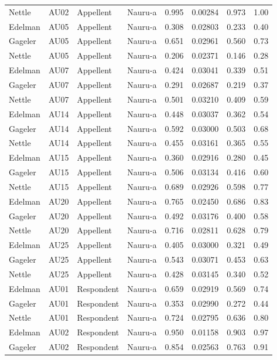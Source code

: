\documentclass{monashthesis}
\begin{document}
\begin{center}
\begin{longtable}{llllllll}
Nettle & AU02 & Appellent & Nauru-a & 0.995 & 0.00284 & 0.973 & 1.00 \\
Edelman & AU05 & Appellent & Nauru-a & 0.308 & 0.02803 & 0.233 & 0.40 \\
Gageler & AU05 & Appellent & Nauru-a & 0.651 & 0.02961 & 0.560 & 0.73 \\
Nettle & AU05 & Appellent & Nauru-a & 0.206 & 0.02371 & 0.146 & 0.28 \\
Edelman & AU07 & Appellent & Nauru-a & 0.424 & 0.03041 & 0.339 & 0.51 \\
Gageler & AU07 & Appellent & Nauru-a & 0.291 & 0.02687 & 0.219 & 0.37 \\
Nettle & AU07 & Appellent & Nauru-a & 0.501 & 0.03210 & 0.409 & 0.59 \\
Edelman & AU14 & Appellent & Nauru-a & 0.448 & 0.03037 & 0.362 & 0.54 \\
Gageler & AU14 & Appellent & Nauru-a & 0.592 & 0.03000 & 0.503 & 0.68 \\
Nettle & AU14 & Appellent & Nauru-a & 0.455 & 0.03161 & 0.365 & 0.55 \\
Edelman & AU15 & Appellent & Nauru-a & 0.360 & 0.02916 & 0.280 & 0.45 \\
Gageler & AU15 & Appellent & Nauru-a & 0.506 & 0.03134 & 0.416 & 0.60 \\
Nettle & AU15 & Appellent & Nauru-a & 0.689 & 0.02926 & 0.598 & 0.77 \\
Edelman & AU20 & Appellent & Nauru-a & 0.765 & 0.02450 & 0.686 & 0.83 \\
Gageler & AU20 & Appellent & Nauru-a & 0.492 & 0.03176 & 0.400 & 0.58 \\
Nettle & AU20 & Appellent & Nauru-a & 0.716 & 0.02811 & 0.628 & 0.79 \\
Edelman & AU25 & Appellent & Nauru-a & 0.405 & 0.03000 & 0.321 & 0.49 \\
Gageler & AU25 & Appellent & Nauru-a & 0.543 & 0.03071 & 0.453 & 0.63 \\
Nettle & AU25 & Appellent & Nauru-a & 0.428 & 0.03145 & 0.340 & 0.52 \\
Edelman & AU01 & Respondent & Nauru-a & 0.659 & 0.02919 & 0.569 & 0.74 \\
Gageler & AU01 & Respondent & Nauru-a & 0.353 & 0.02990 & 0.272 & 0.44 \\
Nettle & AU01 & Respondent & Nauru-a & 0.724 & 0.02795 & 0.636 & 0.80 \\
Edelman & AU02 & Respondent & Nauru-a & 0.950 & 0.01158 & 0.903 & 0.97 \\
Gageler & AU02 & Respondent & Nauru-a & 0.854 & 0.02563 & 0.763 & 0.91 \\

\end{longtable}
\end{center}
\end{document}

